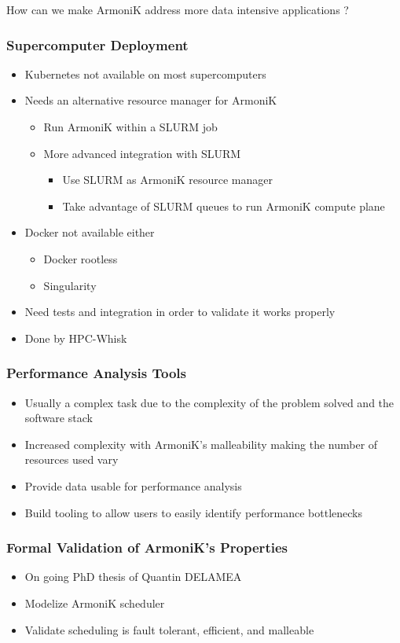 \documentclass[10pt,aspectratio=1609]{beamer}
\begin{document}
\begin{section}{How can we make ArmoniK address more data intensive applications ?}
  \begin{frame}
    \frametitle{Supercomputer Deployment}
    \begin{itemize}
      \item Kubernetes not available on most supercomputers
      \item Needs an alternative resource manager for ArmoniK
      \begin{itemize}
        \item Run ArmoniK within a SLURM job
        \item More advanced integration with SLURM
        \begin{itemize}
          \item Use SLURM as ArmoniK resource manager
          \item Take advantage of SLURM queues to run ArmoniK compute plane
        \end{itemize}
      \end{itemize}
      \item Docker not available either
      \begin{itemize}
        \item Docker rootless
        \item Singularity
      \end{itemize}
      \item Need tests and integration in order to validate it works properly
      \item Done by HPC-Whisk
    \end{itemize}
  \end{frame}

  \begin{frame}
    \frametitle{Performance Analysis Tools}
    \begin{itemize}
      \item Usually a complex task due to the complexity of the problem solved and the software stack
      \item Increased complexity with ArmoniK's malleability making the number of resources used vary
      \item Provide data usable for performance analysis
      \item Build tooling to allow users to easily identify performance bottlenecks
    \end{itemize}
  \end{frame}

  \begin{frame}
    \frametitle{Formal Validation of ArmoniK's Properties}
    \begin{itemize}
      \item On going PhD thesis of Quantin DELAMEA
      \item Modelize ArmoniK scheduler
      \item Validate scheduling is fault tolerant, efficient, and malleable
    \end{itemize}
  \end{frame}


\end{section}
\end{document}
